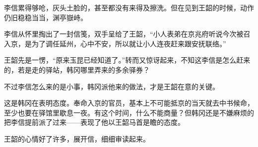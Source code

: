 李信累得够呛，灰头土脸的，甚至都没有来得及擦洗。但在见到王韶的时候，动作仍旧稳稳当当，渊亭嶽峙。

李信从怀里掏出了一封信笺，双手呈给了王韶，“小人表弟在京兆府听说今次被召入京，是为了调任延州，心中不安，所以就让小人连夜赶来跟安抚联络。”

王韶先是一愣，“原来玉昆已经知道了。”转而又惊讶起来，不知这李信是怎么赶来的，若是走的驿站，韩冈哪里弄来的多余驿券？

不过李信怎么来的是小事，韩冈派他来的做法，才是王韶在意的关键。

这是韩冈在表明态度。奉命入京的官员，基本上不可能抵京的当天就去中书候命，至少也要在驿馆里歇息一夜。有这个时间，什么不能商量？但韩冈还是不嫌麻烦的把李信提前派了过来——表现了他以王韶马首是瞻的态度。

王韶的心情好了许多，展开信，细细审读起来。

